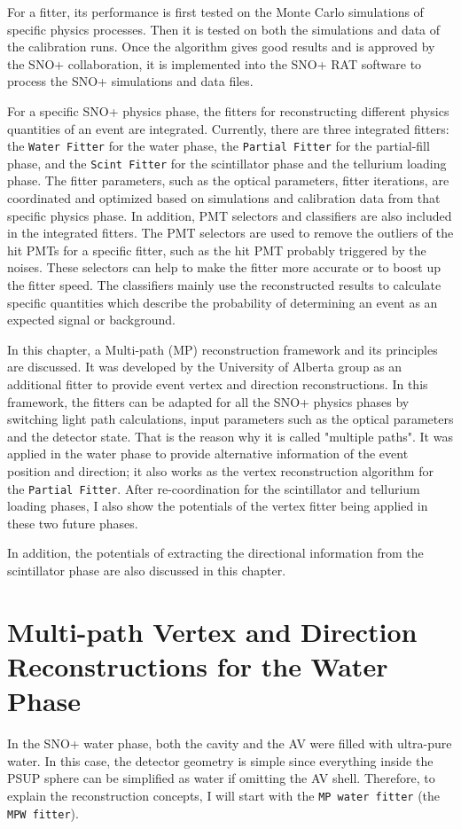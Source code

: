 For a fitter, its performance is first tested on the Monte Carlo simulations of specific physics processes. Then it is tested on both the simulations and data of the calibration runs. Once the algorithm gives good results and is approved by the SNO+ collaboration, it is implemented into the SNO+ RAT software to process the SNO+ simulations and data files.

For a specific SNO+ physics phase, the fitters for reconstructing different physics quantities of an event are integrated. Currently, there are three integrated fitters: the \texttt{Water Fitter} for the water phase, the \texttt{Partial Fitter} for the partial-fill phase, and the \texttt{Scint Fitter} for the scintillator phase and the tellurium loading phase. The fitter parameters, such as the optical parameters, fitter iterations, are coordinated and optimized based on simulations and calibration data from that specific physics phase. In addition, PMT selectors and classifiers are also included in the integrated fitters. The PMT selectors are used to remove the outliers of the hit PMTs for a specific fitter, such as the hit PMT probably triggered by the noises. These selectors can help to make the fitter more accurate or to boost up the fitter speed. The classifiers mainly use the reconstructed results to calculate specific quantities which describe the probability of determining an event as an expected signal or background.

In this chapter, a Multi-path (MP) reconstruction framework and its principles are discussed. It was developed by the University of Alberta group as an additional fitter to provide event vertex and direction reconstructions. In this framework, the fitters can be adapted for all the SNO+ physics phases by switching light path calculations, input parameters such as the optical parameters and the detector state. That is the reason why it is called "multiple paths".  It was applied in the water phase to provide alternative information of the event position and direction; it also works as the vertex reconstruction algorithm for the \texttt{Partial Fitter}. After re-coordination for the scintillator and tellurium loading phases, I also show the potentials of the vertex fitter being applied in these two future phases.

In addition, the potentials of extracting the directional information from the scintillator phase are also discussed in this chapter.

\section{Multi-path Vertex and Direction Reconstructions for the Water Phase}\label{sect:mpw}
In the SNO+ water phase, both the cavity and the AV were filled with ultra-pure water. In this case, the detector geometry is simple since everything inside the PSUP sphere can be simplified as water if omitting the AV shell. Therefore, to explain the reconstruction concepts, I will start with the \texttt{MP water fitter} (the \texttt{MPW fitter}).

